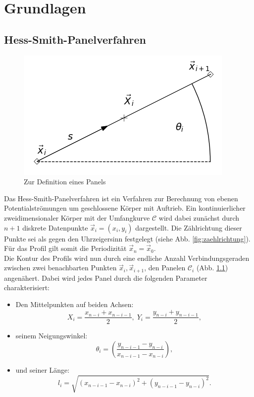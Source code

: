 \chapter{Grundlagen}
\label{chap:hess-smith}


\section{Hess-Smith-Panelverfahren}
\begin{figure}[!h]
\begin{center} \includegraphics[scale=0.5]{figures/panel.png} \end{center}
\caption{Zur Definition eines Panels}
\label{fig:panel}
\end{figure}
Das Hess-Smith-Panelverfahren ist ein Verfahren zur Berechnung von ebenen Potentialströmungen um geschlossene Körper mit Auftrieb. Ein kontinuierlicher zweidimensionaler Körper mit der Umfangkurve $\mathcal{C}$ wird dabei zunächst durch  $n + 1$ diskrete Datenpunkte $\vec x_i = (x_i, y_i)$ dargestellt. Die Zählrichtung dieser Punkte sei als gegen den Uhrzeigersinn festgelegt (siehe Abb. \ref{fig:zaehlrichtung}). Für das Profil gilt somit die Periodizität $\vec x_n = \vec x_0$.\\
Die Kontur des Profils wird nun durch eine endliche Anzahl Verbindungsgeraden zwischen zwei benachbarten Punkten $\vec x_i, \vec x_{i+1}$, den Panelen $\mathcal{C}_i$ (Abb. \ref{fig:panel}) angenähert. Dabei wird jedes Panel durch die folgenden Parameter charakterisiert:
\begin{itemize}
\item Den Mittelpunkten auf beiden Achsen: 
\begin{equation}
\label{eq:X}
X_i =  \frac{x_{n-i}+x_{n-i-1}}{2}, \; Y_i =  \frac{y_{n-i}+y_{n-i-1}}{2},
\end{equation}
\item seinem Neigungswinkel: 
\begin{equation}
\theta_i =  \left( \frac{y_{n-i-1} - y_{n-i}}{x_{n-i-1} - x_{n-i}} \right),
\end{equation}
\item und seiner Länge: 
\begin{equation}
\label{eq:l}
l_i =  \sqrt{(x_{n-i-1} - x_{n-i})^2 + (y_{n-i-1} - y_{n-i})^2}.
\end{equation}
\end{itemize}




